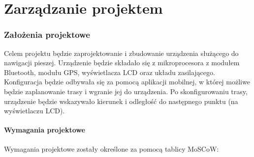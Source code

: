 \part{Zarządzanie projektem}

\section{Założenia projektowe}
Celem projektu będzie zaprojektowanie i zbudowanie urządzenia służącego do nawigacji pieszej. Urządzenie będzie składało się z mikroprocesora z modułem Bluetooth, modułu GPS, wyświetlacza LCD oraz układu zasilającego. Konfiguracja będzie odbywała się za pomocą aplikacji mobilnej, w której możliwe będzie zaplanowanie trasy i wgranie jej do urządzenia.
Po skonfigurowaniu trasy, urządzenie będzie wskazywało kierunek i odległość do następnego punktu (na wyświetlaczu LCD).

\subsection{Wymagania projektowe}
Wymagania projektowe zostały określone za pomocą tablicy MoSCoW:

